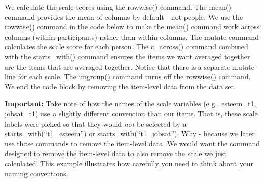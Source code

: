 \documentclass[
]{krantz}
\begin{document}
We calculate the scale scores using the rowwise() command. The mean() command provides the mean of columns by default - not people. We use the rowwise() command in the code below to make the mean() command work across columns (within participants) rather than within columns. The mutate command calculates the scale score for each person. The c\_across() command combined with the starts\_with() command ensures the items we want averaged together are the items that are averaged together. Notice that there is a separate mutate line for each scale. The ungroup() command turns off the rowwise() command. We end the code block by removing the item-level data from the data set.

\textbf{Important:} Take note of how the names of the scale variables (e.g., esteem\_t1, jobsat\_t1) use a slightly different convention than our items. That is, these scale labels were picked so that they would \emph{not} be selected by a starts\_with(``t1\_esteem'') or starts\_with(``t1\_jobsat''). Why - because we later use those commands to remove the item-level data. We would want the command designed to remove the item-level data to also remove the scale we just calculated! This example illustrates how carefully you need to think about your naming conventions.
\end{document}
